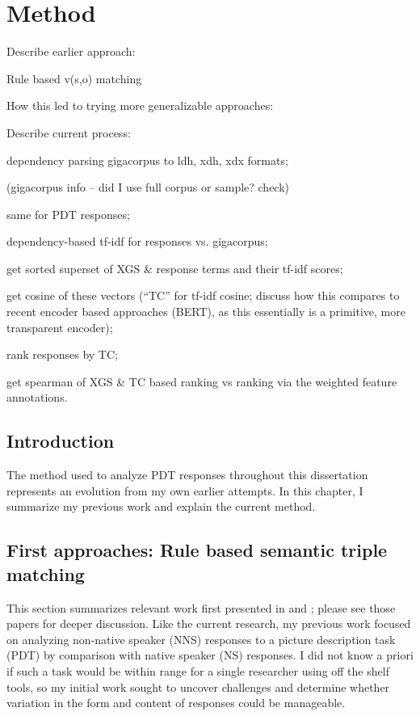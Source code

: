 \chapter{Method}
\label{chap:method}
Describe earlier approach:

Rule based v(s,o) matching

How this led to trying more generalizable approaches:

Describe current process:

dependency parsing gigacorpus to ldh, xdh, xdx formats;

(gigacorpus info -- did I use full corpus or sample? check)

same for PDT responses;

dependency-based tf-idf for responses vs. gigacorpus;

get sorted superset of XGS \& response terms and their tf-idf scores;

get cosine of these vectors (``TC'' for tf-idf cosine; discuss how this compares to recent encoder based approaches (BERT), as this essentially is a primitive, more transparent encoder);

rank responses by TC;

get spearman of XGS \& TC based ranking vs ranking via the weighted feature annotations.

\section{Introduction}
The method used to analyze PDT responses throughout this dissertation represents an evolution from my own earlier attempts. In this chapter, I summarize my previous work and explain the current method.

\section{First approaches: Rule based semantic triple matching}
This section summarizes relevant work first presented in \citet{king:dickinson:13} and \citet{king:dickinson:14}; please see those papers for deeper discussion. Like the current research, my previous work focused on analyzing non-native speaker (NNS) responses to a picture description task (PDT) by comparison with native speaker (NS) responses. I did not know a priori if such a task would be within range for a single researcher using off the shelf tools, so my initial work sought to uncover challenges and determine whether variation in the form and content of responses could be manageable.

